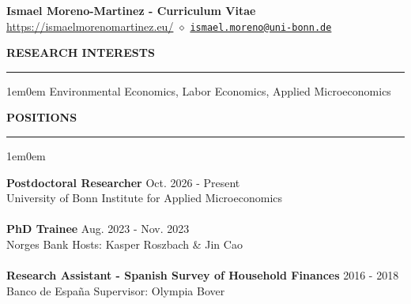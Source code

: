 \documentclass[12pt]{article}
\begin{document}
\pagestyle{fancy}
\fancyhf{} %
\renewcommand{\headrulewidth}{0pt}





\begin{center}
	{\Large \bfseries Ismael Moreno-Martinez - Curriculum Vitae} \\
	\vspace{8pt}
	\url{https://ismaelmorenomartinez.eu/} $\diamond$   \href{mailto:ismael.moreno@uni-bonn.de}{\texttt{ismael.moreno@uni-bonn.de}}\\
\end{center}


\vspace{0.5em} %
\noindent\textbf{RESEARCH INTERESTS}\\
\noindent\rule[8pt]{\textwidth}{0.5pt}

\begin{adjustwidth}{1em}{0em}
Environmental Economics, Labor Economics, Applied Microeconomics \\

\end{adjustwidth}

\vspace{0.5em} %
\noindent\textbf{POSITIONS}\\
\noindent\rule[8pt]{\textwidth}{0.5pt}

\begin{adjustwidth}{1em}{0em}

\textbf{Postdoctoral Researcher} \hfill Oct. 2026 - Present \\
University of Bonn \hfill
Institute for Applied Microeconomics\\ \\

\noindent\textbf{PhD Trainee} \hfill Aug. 2023 - Nov. 2023 \\
Norges Bank \hfill
Hosts: Kasper Roszbach \& Jin Cao\\ \\

\noindent\textbf{Research Assistant - Spanish Survey of Household Finances} \hfill 2016 - 2018 \\
Banco de Espa{\~n}a \hfill
Supervisor: Olympia Bover\\ \\

\end{adjustwidth}
\end{document}
